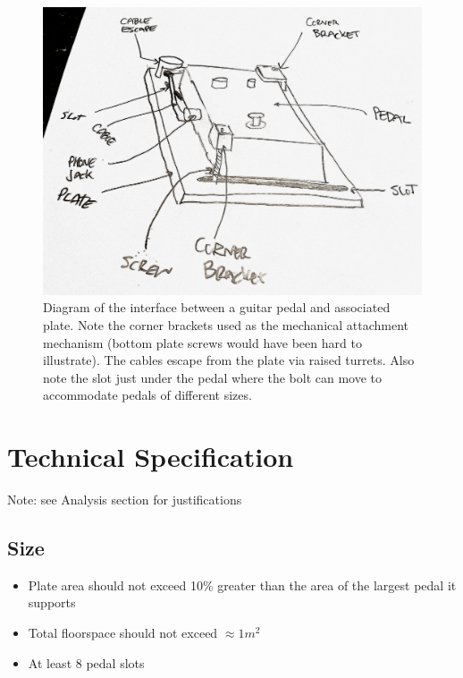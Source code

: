 \documentclass{article}
\begin{document}
		\begin{figure}
			\centering
			\includegraphics[width = 0.8 \textwidth]{PedalPlateSubsystemPerspective.jpg}
			\caption{Diagram of the interface between a guitar pedal and associated plate.  Note the corner brackets used as the mechanical attachment mechanism (bottom plate screws would have been hard to illustrate).  The cables escape from the plate via raised turrets.  Also note the slot just under the pedal where the bolt can move to accommodate pedals of different sizes.}
			\label{fig:PedalPlateSubsystem}
		\end{figure}

\section{Technical Specification}
	Note: see Analysis section for justifications
	\subsection{Size}
	\begin{itemize}
		\item Plate area should not exceed 10\% greater than the area of the largest pedal it supports
		\item Total floorspace should not exceed $ \approx 1 m^2$
		\item At least 8 pedal slots
	\end{itemize}
\end{document}
